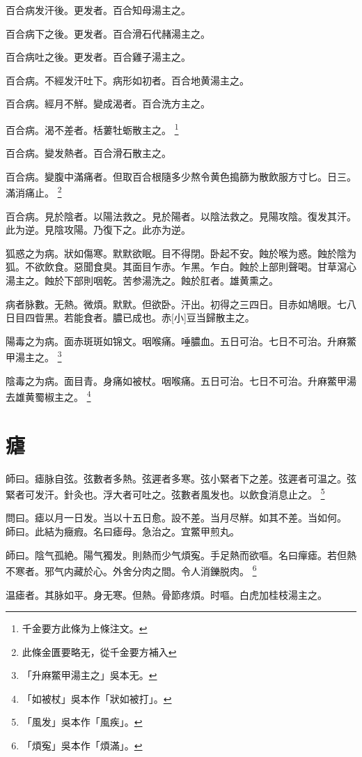 \documentclass[12pt,twoside,UTF8,b5paper]{ctexbook}
\begin{document}
百合病发汗後。更发者。百合知母湯主之。

百合病下之後。更发者。百合滑石代赭湯主之。

百合病吐之後。更发者。百合雞子湯主之。

百合病。不經发汗吐下。病形如初者。百合地黄湯主之。

百合病。經月不觧。變成渴者。百合洗方主之。

百合病。渴不差者。栝蔞牡蛎散主之。
	\footnote{千金要方此條为上條注文。}

百合病。變发熱者。百合滑石散主之。

百合病。變腹中滿痛者。但取百合根隨多少熬令黄色搗篩为散飲服方寸匕。日三。滿消痛止。
	\footnote{此條金匱要略无，從千金要方補入}

百合病。見於陰者。以陽法救之。見於陽者。以陰法救之。見陽攻陰。復发其汗。此为逆。見陰攻陽。乃復下之。此亦为逆。

狐惑之为病。狀如傷寒。默默欲眠。目不得閉。卧起不安。蝕於喉为惑。蝕於陰为狐。不欲飲食。惡聞食臭。其面目乍赤。乍黑。乍白。蝕於上部則聲喝。甘草瀉心湯主之。蝕於下部則咽乾。苦参湯洗之。蝕於肛者。雄黄熏之。

病者脉數。无熱。微煩。默默。但欲卧。汗出。初得之三四日。目赤如鳩眼。七八日目四眥黑。若能食者。膿已成也。赤[小]豆当歸散主之。

陽毒之为病。面赤斑斑如锦文。咽喉痛。唾膿血。五日可治。七日不可治。升麻鱉甲湯主之。
	\footnote{「升麻鱉甲湯主之」吳本无。}

陰毒之为病。面目青。身痛如被杖。咽喉痛。五日可治。七日不可治。升麻鱉甲湯去雄黄蜀椒主之。
	\footnote{「如被杖」吳本作「狀如被打」。}

\chapter{瘧}

師曰。瘧脉自弦。弦數者多熱。弦遲者多寒。弦小緊者下之差。弦遲者可温之。弦緊者可发汗。針灸也。浮大者可吐之。弦數者風发也。以飲食消息止之。
	\footnote{「風发」吳本作「風疾」。}

問曰。瘧以月一日发。当以十五日愈。設不差。当月尽觧。如其不差。当如何。\\
師曰。此結为癥瘕。名曰瘧母。急治之。宜鱉甲煎丸。

師曰。陰气孤絶。陽气獨发。則熱而少气煩寃。手足熱而欲嘔。名曰癉瘧。若但熱不寒者。邪气内藏於心。外舍分肉之間。令人消鑠脱肉。
	\footnote{「煩寃」吳本作「煩滿」。}

温瘧者。其脉如平。身无寒。但熱。骨節疼煩。时嘔。白虎加桂枝湯主之。
\end{document}
